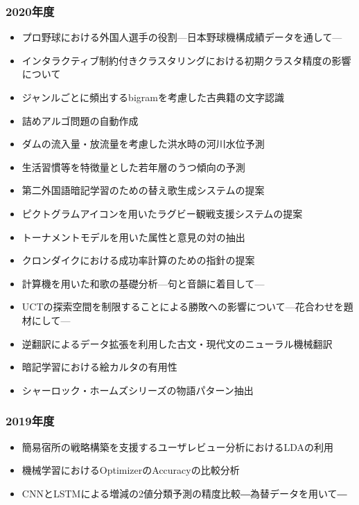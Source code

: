 \documentclass[uplatex,jis2004,a4paper,11pt]{jsarticle}
\begin{document}
\begin{multicols}{2}
{\subsubsection*{2020年度}
\begin{itemize}
  \item プロ野球における外国人選手の役割---日本野球機構成績データを通して---
  \item インタラクティブ制約付きクラスタリングにおける初期クラスタ精度の影響について
  \item ジャンルごとに頻出するbigramを考慮した古典籍の文字認識
  \item 詰めアルゴ問題の自動作成
  \item ダムの流入量・放流量を考慮した洪水時の河川水位予測
  \item 生活習慣等を特徴量とした若年層のうつ傾向の予測
  \item 第二外国語暗記学習のための替え歌生成システムの提案
  \item ピクトグラムアイコンを用いたラグビー観戦支援システムの提案
  \item トーナメントモデルを用いた属性と意見の対の抽出
  \item クロンダイクにおける成功率計算のための指針の提案
  \item 計算機を用いた和歌の基礎分析---句と音韻に着目して---
  \item UCTの探索空間を制限することによる勝敗への影響について---花合わせを題材にして---
  \item 逆翻訳によるデータ拡張を利用した古文・現代文のニューラル機械翻訳
  \item 暗記学習における絵カルタの有用性
  \item シャーロック・ホームズシリーズの物語パターン抽出
\end{itemize}
\vspace{-5mm}
\subsubsection*{2019年度}
\begin{itemize}
  \item 簡易宿所の戦略構築を支援するユーザレビュー分析におけるLDAの利用
  \item 機械学習におけるOptimizerのAccuracyの比較分析
  \item CNNとLSTMによる増減の2値分類予測の精度比較―為替データを用いて― 
\end{itemize}
\vspace{-.4cm}
}
\end{multicols}
\end{document}
